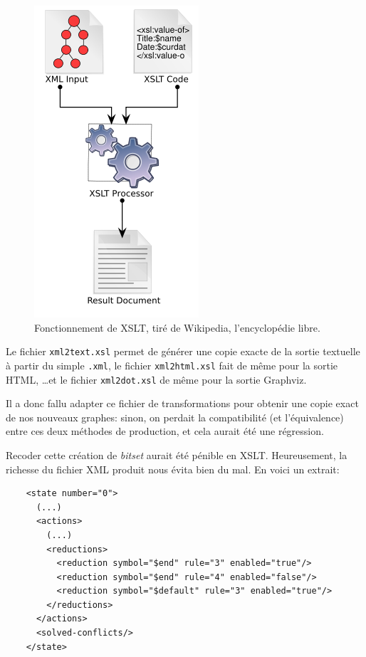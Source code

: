 \documentclass[a4paper,11pt,twoside,final]{article}
\begin{document}
  \begin{figure}[H]
    \begin{center}
      \includegraphics[scale=0.55]{images/xslt}
      \caption{Fonctionnement de XSLT, tiré de Wikipedia, l'encyclopédie
      libre.}
    \end{center}
  \end{figure}

  Le fichier \texttt{xml2text.xsl} permet de générer une copie exacte de la
  sortie textuelle à partir du simple \texttt{.xml}, le fichier
  \texttt{xml2html.xsl} fait de même pour la sortie HTML, \ldots et le fichier
  \texttt{xml2dot.xsl} de même pour la sortie Graphviz.

  Il a donc fallu adapter ce fichier de transformations pour obtenir une copie
  exact de nos nouveaux graphes: sinon, on perdait la compatibilité (et
  l'équivalence) entre ces deux méthodes de production, et cela aurait été une
  régression.

  Recoder cette création de \textit{bitset} aurait été pénible en XSLT\@.
  Heureusement, la richesse du fichier XML produit nous évita bien du mal. En
  voici un extrait:

  \begin{verbatim}
    <state number="0">
      (...)
      <actions>
        (...)
        <reductions>
          <reduction symbol="$end" rule="3" enabled="true"/>
          <reduction symbol="$end" rule="4" enabled="false"/>
          <reduction symbol="$default" rule="3" enabled="true"/>
        </reductions>
      </actions>
      <solved-conflicts/>
    </state>
  \end{verbatim}
\end{document}
